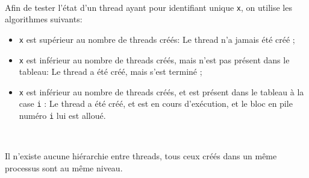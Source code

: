 \documentclass{article}
\begin{document}
			~\par{Afin de tester l'état d'un thread ayant pour identifiant unique \texttt{x}, on utilise les algorithmes suivants: }
				\begin{itemize}
					\item{\texttt{x} est supérieur au nombre de threads créés: } Le thread n'a jamais été créé ;
					\item{\texttt{x} est inférieur au nombre de threads créés, mais n'est pas présent dans le tableau: } Le thread a été créé, mais s'est terminé ;
					\item{\texttt{x} est inférieur au nombre de threads créés, et est présent dans le tableau à la case \texttt{i} : Le thread a été créé, et est en cours d'exécution, et le bloc en pile numéro \texttt{i} lui est alloué.}
				\end{itemize}
				~\par{Il n'existe aucune hiérarchie entre threads, tous ceux créés dans un même processus sont au même niveau.}
\end{document}
